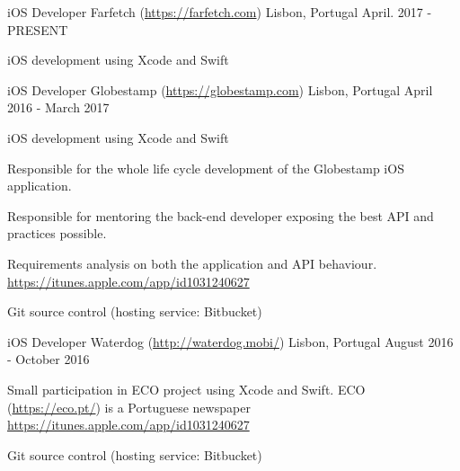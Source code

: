 

\begin{cventries}

\cventry
{iOS Developer} %
{Farfetch (\url{https://farfetch.com}) } %
{Lisbon, Portugal} %
{April. 2017 - PRESENT} %
{
	\begin{cvitems} %
		\item{iOS development using Xcode and Swift}
	\end{cvitems}
}

  \cventry
    {iOS Developer} %
    {Globestamp (\url{https://globestamp.com}) } %
    {Lisbon, Portugal} %
    {April 2016 - March 2017} %
    {
      \begin{cvitems} %
      	\item{iOS development using Xcode and Swift}
        \item {Responsible for the whole life cycle development of the Globestamp iOS application.}
        \item {Responsible for mentoring the back-end developer exposing the best API and practices possible.}
        \item {Requirements analysis on both the application and API behaviour.\\}
		\url{https://itunes.apple.com/app/id1031240627}
	 	\item {Git source control (hosting service: Bitbucket)}
      \end{cvitems}
    }

  \cventry
	{iOS Developer} %
    {Waterdog (\url{http://waterdog.mobi/}) } %
    {Lisbon, Portugal} %
    {August 2016 - October 2016} %
    {
	\begin{cvitems} %
		\item {Small participation in ECO project using Xcode and Swift. ECO (\url{https://eco.pt/}) is a Portuguese newspaper\\}
		\url{https://itunes.apple.com/app/id1031240627}
		\item {Git source control (hosting service: Bitbucket)}
	\end{cvitems}
}


\end{cventries}
